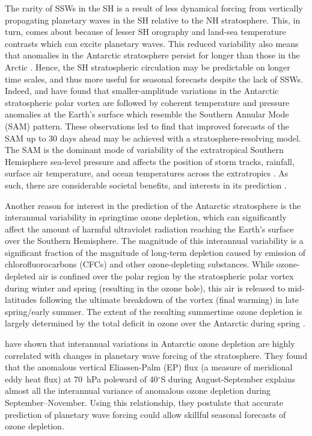 The rarity of SSWs in the SH is a result of less dynamical forcing from
vertically propagating planetary waves in the SH relative to the NH
stratosphere. This, in turn, comes about because of lesser SH orography and
land-sea temperature contrasts which can excite planetary waves. This reduced
variability also means that anomalies in the Antarctic stratosphere persist for
longer than those in the Arctic \citep{Simpson2011}. Hence, the SH stratospheric
circulation may be predictable on longer time scales, and thus more useful for
seasonal forecasts despite the lack of SSWs. Indeed, \citet{Thompson2005} and
\citet{Son2013a} have found that smaller-amplitude variations in the Antarctic
stratospheric polar vortex are followed by coherent temperature and pressure
anomalies at the Earth's surface which resemble the Southern Annular Mode (SAM)
pattern. These observations led \citet{Roff2011} to find that improved forecasts
of the SAM up to 30 days ahead may be achieved with a stratosphere-resolving
model. The SAM is the dominant mode of variability of the extratropical Southern
Hemisphere sea-level pressure and affects the position of storm tracks,
rainfall, surface air temperature, and ocean temperatures across the
extratropics \citep[e.g.,][]{Silvestri2003, Reason2005, Hendon2007}. As such,
there are considerable societal benefits, and interests in its prediction
\citep{Lim2013}.

Another reason for interest in the prediction of the Antarctic stratosphere is
the interannual variability in springtime ozone depletion, which can
significantly affect the amount of harmful ultraviolet radiation reaching the
Earth's surface over the Southern Hemisphere. The magnitude of this interannual
variability is a significant fraction of the magnitude of long-term depletion
caused by emission of chlorofluorocarbons (CFCs) and other ozone-depleting
substances. While ozone-depleted air is confined over the polar region by the
stratospheric polar vortex during winter and spring (resulting in the ozone
hole), this air is released to mid-latitudes following the ultimate breakdown of
the vortex (final warming) in late spring/early summer. The extent of the
resulting summertime ozone depletion is largely determined by the total deficit
in ozone over the Antarctic during spring \citep{Bodeker2005}.

\citet{Salby2012} have shown that interannual variations in Antarctic ozone
depletion are highly correlated with changes in planetary wave forcing of the
stratosphere. They found that the anomalous vertical Eliassen-Palm (EP) flux (a
measure of meridional eddy heat flux) at 70~hPa poleward of 40$^{\circ}$S during
August-September explains almost all the interannual variance of anomalous ozone
depletion during September--November. Using this relationship, they postulate
that accurate prediction of planetary wave forcing could allow skillful seasonal
forecasts of ozone depletion.

